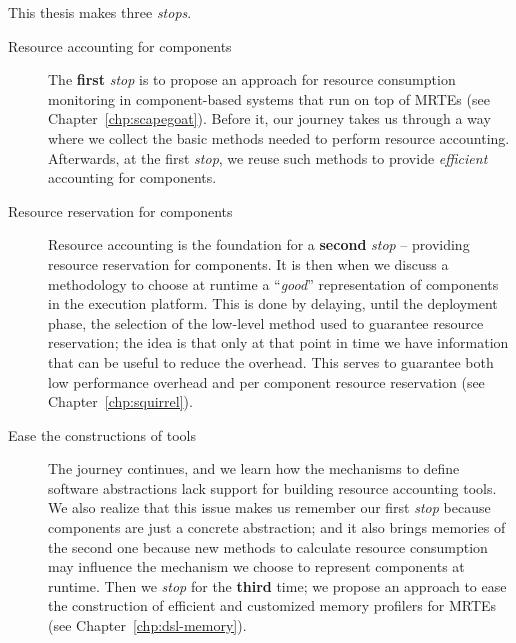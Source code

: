 This thesis makes three \textit{stops}.
\begin{description}
\item[Resource accounting for components] The \textbf{first} \textit{stop} is to propose an approach for resource consumption monitoring in component-based systems that run on top of MRTEs (see  Chapter~\ref{chp:scapegoat}).
Before it, our journey takes us through a way where we collect the basic methods needed to perform resource accounting.
Afterwards, at the first \textit{stop}, we reuse such methods to provide \textit{efficient} accounting for components.

\item[Resource reservation for components] Resource accounting is the foundation for a \textbf{second} \textit{stop} -- providing resource reservation for components.
It is then when we discuss a methodology to choose at runtime a ``\textit{good}'' representation of components in the execution platform.
This is done by delaying, until the deployment phase, the selection of the low-level method used to guarantee resource reservation; the idea is that only at that point in time we have information that can be useful to reduce the overhead.
This serves to guarantee both low performance overhead and per component resource reservation (see  Chapter~\ref{chp:squirrel}).

\item[Ease the constructions of tools] The journey continues, and we learn how the mechanisms to define software abstractions lack support for building resource accounting tools.
We also realize that this issue makes us remember our first \textit{stop} because components are just a concrete abstraction; and it also brings memories of the second one because new methods to calculate resource consumption may influence the mechanism we choose to represent components at runtime. 
Then we \textit{stop} for the \textbf{third} time; we propose an approach to ease the construction of efficient and customized memory profilers for MRTEs (see  Chapter~\ref{chp:dsl-memory}).
\end{description}

\newpage\thispagestyle{empty}\addtocounter{page}{-1}




